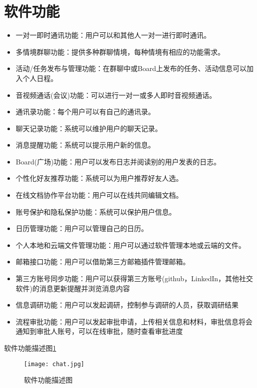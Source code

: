 \section{\color{red}软件功能}
\begin{itemize}
	\item 一对一即时通讯功能：用户可以和其他人一对一进行即时通讯。
	\item 多情境群聊功能：提供多种群聊情境，每种情境有相应的功能需求。
	\item 活动/任务发布与管理功能：在群聊中或Board上发布的任务、活动信息可以加入个人日程。
	\item 音视频通话(会议)功能：可以进行一对一或多人即时音视频通话。
	\item 通讯录功能：每个用户可以有自己的通讯录。
	\item 聊天记录功能：系统可以维护用户的聊天记录。
	\item 消息提醒功能：系统可以提示用户新的信息。
	\item Board(广场)功能：用户可以发布日志并阅读别的用户发表的日志。
	\item 个性化好友推荐功能：系统可以为用户推荐好友人选。
	\item 在线文档协作平台功能：用户可以在线共同编辑文档。
	\item 账号保护和隐私保护功能：系统可以保护用户信息。
	\item 日历管理功能：用户可以管理自己的日历。
	\item 个人本地和云端文件管理功能：用户可以通过软件管理本地或云端的文件。
	\item 邮箱接口功能：用户可以借助第三方邮箱插件管理邮箱。
	\item {\color{red} 第三方账号同步功能：用户可以获得第三方账号(github，LinkedIn，其他社交软件)的消息更新提醒并浏览消息内容}
	\item {\color{red} 信息调研功能：用户可以发起调研，控制参与调研的人员，获取调研结果}
	\item {\color{red} 流程审批功能：用户可以发起审批申请，上传相关信息和材料，审批信息将会通知到审批人账号，可以在线审批，随时查看审批进度}
\end{itemize}
{\color{red} 软件功能描述图}\ref{fig:function}
\newpage
\begin{figure}[ht]
	\centering
	\texttt{[image: chat.jpg]}\label{tab:classification}
	\caption{\color{red} 软件功能描述图}\label{fig:function}
	\newpage
\end{figure}
\newpage
